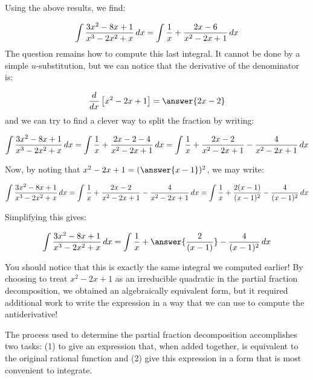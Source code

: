\documentclass{ximera}
\begin{document}
\begin{exercise}
\begin{exercise}
\begin{exercise}
\begin{exercise}
Using the above results, we find:

 \[
 \int \frac{3x^2-8x+1}{x^3-2x^2+x} \mathop{}\!d x =\int \frac{1}{x}+\frac{2x-6}{x^2-2x+1} \mathop{}\!d x
\]
The question remains how to compute this last integral.  It cannot be done by a simple $u$-substitution, but we can notice that the derivative of the denominator is:

\[ \ddx \left[x^2-2x+1\right] = \answer{2x-2}
\]
and we can try to find a clever way to split the fraction by writing:

\[
 \int \frac{3x^2-8x+1}{x^3-2x^2+x} \mathop{}\!d x =\int \frac{1}{x}+\frac{2x-2-4}{x^2-2x+1} \mathop{}\!d x=\int \frac{1}{x}+\frac{2x-2}{x^2-2x+1} -\frac{4}{x^2-2x+1} \mathop{}\!d x
\]

Now, by noting that $x^2-2x+1 = (\answer{x-1})^2$, we may write:

\[
 \int \frac{3x^2-8x+1}{x^3-2x^2+x} \mathop{}\!d x =\int \frac{1}{x}+\frac{2x-2}{x^2-2x+1} -\frac{4}{x^2-2x+1} \mathop{}\!d x =\int \frac{1}{x}+\frac{2(x-1)}{(x-1)^2} -\frac{4}{(x-1)^2} \mathop{}\!d x
\]

Simplifying this gives:

\[
 \int \frac{3x^2-8x+1}{x^3-2x^2+x} \d x = \int \frac{1}{x}+\answer{\frac{2}{(x-1)}} -\frac{4}{(x-1)^2} \d x
\]

\begin{feedback}
You should notice that this is exactly the same integral we computed earlier!  By choosing to treat $x^2-2x+1$ as an irreducible quadratic in the partial fraction decomposition, we obtained an algebraically equivalent form, but it required additional work to write the expression in a way that we can use to compute the antiderivative!

The process used to determine the partial fraction decomposition accomplishes two tasks: (1) to give an expression that, when  added together, is equivalent to the original rational function and (2) give this expression in a form that is most convenient to integrate.
\end{feedback}

\end{exercise}
\end{exercise}
\end{exercise}
\end{exercise}
\end{document}
